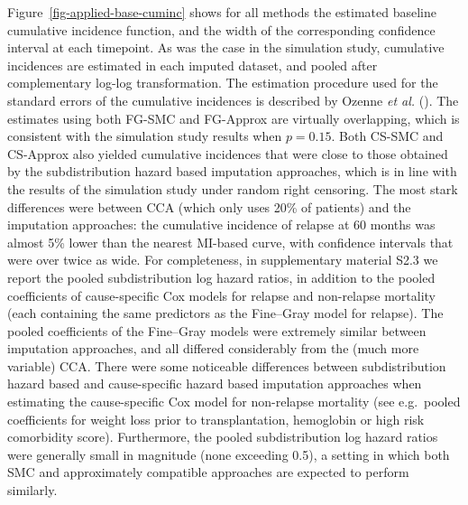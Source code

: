 \documentclass[
  letterpaper,
  paper=240mm:170mm,
  twoside=true,
  open=right,
  fontsize=10pt,
  pagesize=false,
  BCOR=15mm,
  DIV=14,
  headinclude=true,
  footinclude=false,
  headsepline=on]{scrbook}
\begin{document}
Figure~\ref{fig-applied-base-cuminc} shows for all methods the estimated
baseline cumulative incidence function, and the width of the
corresponding confidence interval at each timepoint. As was the case in
the simulation study, cumulative incidences are estimated in each
imputed dataset, and pooled after complementary log-log transformation.
The estimation procedure used for the standard errors of the cumulative
incidences is described by Ozenne \emph{et al.}
(). The estimates using both FG-SMC and
FG-Approx are virtually overlapping, which is consistent with the
simulation study results when \(p = 0.15\). Both CS-SMC and CS-Approx
also yielded cumulative incidences that were close to those obtained by
the subdistribution hazard based imputation approaches, which is in line
with the results of the simulation study under random right censoring.
The most stark differences were between CCA (which only uses 20\% of
patients) and the imputation approaches: the cumulative incidence of
relapse at 60 months was almost 5\% lower than the nearest MI-based
curve, with confidence intervals that were over twice as wide. For
completeness, in supplementary material S2.3 we report the pooled
subdistribution log hazard ratios, in addition to the pooled
coefficients of cause-specific Cox models for relapse and non-relapse
mortality (each containing the same predictors as the Fine--Gray model
for relapse). The pooled coefficients of the Fine--Gray models were
extremely similar between imputation approaches, and all differed
considerably from the (much more variable) CCA. There were some
noticeable differences between subdistribution hazard based and
cause-specific hazard based imputation approaches when estimating the
cause-specific Cox model for non-relapse mortality (see e.g.~pooled
coefficients for weight loss prior to transplantation, hemoglobin or
high risk comorbidity score). Furthermore, the pooled subdistribution
log hazard ratios were generally small in magnitude (none exceeding
0.5), a setting in which both SMC and approximately compatible
approaches are expected to perform similarly.
\end{document}
